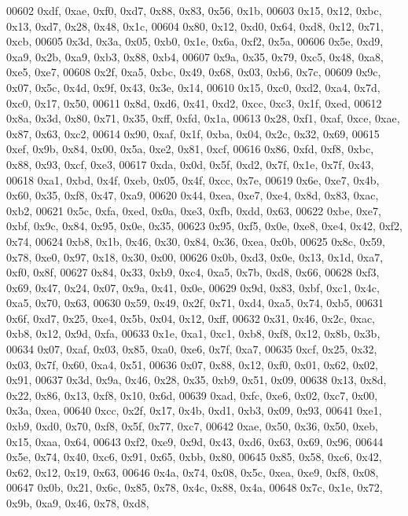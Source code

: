 \begin{DoxyCode}
00602   0xdf, 0xae, 0xf0, 0xd7, 0x88, 0x83, 0x56, 0x1b,
00603   0x15, 0x12, 0xbc, 0x13, 0xd7, 0x28, 0x48, 0x1c,
00604   0x80, 0x12, 0xd0, 0x64, 0xd8, 0x12, 0x71, 0xcb,
00605   0x3d, 0x3a, 0x05, 0xb0, 0x1e, 0x6a, 0xf2, 0x5a,
00606   0x5e, 0xd9, 0xa9, 0x2b, 0xa9, 0xb3, 0x88, 0xb4,
00607   0x9a, 0x35, 0x79, 0xc5, 0x48, 0xa8, 0xe5, 0xe7,
00608   0x2f, 0xa5, 0xbc, 0x49, 0x68, 0x03, 0xb6, 0x7c,
00609   0x9c, 0x07, 0x5c, 0x4d, 0x9f, 0x43, 0x3e, 0x14,
00610   0x15, 0xc0, 0xd2, 0xa4, 0x7d, 0xc0, 0x17, 0x50,
00611   0x8d, 0xd6, 0x41, 0xd2, 0xcc, 0xc3, 0x1f, 0xed,
00612   0x8a, 0x3d, 0x80, 0x71, 0x35, 0xff, 0xfd, 0x1a,
00613   0x28, 0xf1, 0xaf, 0xce, 0xae, 0x87, 0x63, 0xc2,
00614   0x90, 0xaf, 0x1f, 0xba, 0x04, 0x2c, 0x32, 0x69,
00615   0xef, 0x9b, 0x84, 0x00, 0x5a, 0xe2, 0x81, 0xcf,
00616   0x86, 0xfd, 0xf8, 0xbc, 0x88, 0x93, 0xcf, 0xe3,
00617   0xda, 0x0d, 0x5f, 0xd2, 0x7f, 0x1e, 0x7f, 0x43,
00618   0xa1, 0xbd, 0x4f, 0xeb, 0x05, 0x4f, 0xcc, 0x7e,
00619   0x6e, 0xe7, 0x4b, 0x60, 0x35, 0xf8, 0x47, 0xa9,
00620   0x44, 0xea, 0xe7, 0xe4, 0x8d, 0x83, 0xac, 0xb2,
00621   0x5c, 0xfa, 0xed, 0x0a, 0xe3, 0xfb, 0xdd, 0x63,
00622   0xbe, 0xe7, 0xbf, 0x9c, 0x84, 0x95, 0x0e, 0x35,
00623   0x95, 0xf5, 0x0e, 0xe8, 0xe4, 0x42, 0xf2, 0x74,
00624   0xb8, 0x1b, 0x46, 0x30, 0x84, 0x36, 0xea, 0x0b,
00625   0x8c, 0x59, 0x78, 0xe0, 0x97, 0x18, 0x30, 0x00,
00626   0x0b, 0xd3, 0x0e, 0x13, 0x1d, 0xa7, 0xf0, 0x8f,
00627   0x84, 0x33, 0xb9, 0xc4, 0xa5, 0x7b, 0xd8, 0x66,
00628   0xf3, 0x69, 0x47, 0x24, 0x07, 0x9a, 0x41, 0x0e,
00629   0x9d, 0x83, 0xbf, 0xc1, 0x4c, 0xa5, 0x70, 0x63,
00630   0x59, 0x49, 0x2f, 0x71, 0xd4, 0xa5, 0x74, 0xb5,
00631   0x6f, 0xd7, 0x25, 0xe4, 0x5b, 0x04, 0x12, 0xff,
00632   0x31, 0x46, 0x2c, 0xac, 0xb8, 0x12, 0x9d, 0xfa,
00633   0x1e, 0xa1, 0xc1, 0xb8, 0xf8, 0x12, 0x8b, 0x3b,
00634   0x07, 0xaf, 0x03, 0x85, 0xa0, 0xe6, 0x7f, 0xa7,
00635   0xcf, 0x25, 0x32, 0x03, 0x7f, 0x60, 0xa4, 0x51,
00636   0x07, 0x88, 0x12, 0xf0, 0x01, 0x62, 0x02, 0x91,
00637   0x3d, 0x9a, 0x46, 0x28, 0x35, 0xb9, 0x51, 0x09,
00638   0x13, 0x8d, 0x22, 0x86, 0x13, 0xf8, 0x10, 0x6d,
00639   0xad, 0xfc, 0xe6, 0x02, 0xc7, 0x00, 0x3a, 0xea,
00640   0xcc, 0x2f, 0x17, 0x4b, 0xd1, 0xb3, 0x09, 0x93,
00641   0xe1, 0xb9, 0xd0, 0x70, 0xf8, 0x5f, 0x77, 0xc7,
00642   0xae, 0x50, 0x36, 0x50, 0xeb, 0x15, 0xaa, 0x64,
00643   0xf2, 0xe9, 0x9d, 0x43, 0xd6, 0x63, 0x69, 0x96,
00644   0x5e, 0x74, 0x40, 0xc6, 0x91, 0x65, 0xbb, 0x80,
00645   0x85, 0x58, 0xc6, 0x42, 0x62, 0x12, 0x19, 0x63,
00646   0x4a, 0x74, 0x08, 0x5c, 0xea, 0xe9, 0xf8, 0x08,
00647   0x0b, 0x21, 0x6c, 0x85, 0x78, 0x4c, 0x88, 0x4a,
00648   0x7c, 0x1e, 0x72, 0x9b, 0xa9, 0x46, 0x78, 0xd8,

\end{DoxyCode}

